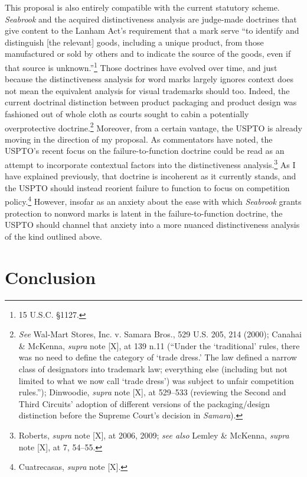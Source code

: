 \documentclass[letterpaper, 11pt, oneside]{article}
\begin{document}
This proposal is also entirely compatible with the current statutory scheme. \textit{Seabrook} and the acquired distinctiveness analysis are judge-made doctrines that give content to the Lanham Act's requirement that a mark serve ``to identify and distinguish [the relevant] goods, including a unique product, from those manufactured or sold by others and to indicate the source of the goods, even if that source is unknown.''\footnote{15 U.S.C. \S 1127.} Those doctrines have evolved over time, and just because the distinctiveness analysis for word marks largely ignores context does not mean the equivalent analysis for visual trademarks should too. Indeed, the current doctrinal distinction between product packaging and product design was fashioned out of whole cloth as courts sought to cabin a potentially overprotective doctrine.\footnote{\textit{See} Wal-Mart Stores, Inc. v. Samara Bros., 529 U.S. 205, 214 (2000); Canahai \& McKenna, \textit{supra} note [X], at 139 n.11 (``Under the `traditional' rules, there was no need to define the category of `trade dress.' The law defined a narrow class of designators into trademark law; everything else (including but not limited to what we now call `trade dress') was subject to unfair competition rules.''); Dinwoodie, \textit{supra} note [X], at 529–533 (reviewing the Second and Third Circuits' adoption of different versions of the packaging/design distinction before the Supreme Court's decision in \textit{Samara}).} Moreover, from a certain vantage, the USPTO is already moving in the direction of my proposal. As commentators have noted, the USPTO's recent focus on the failure-to-function doctrine could be read as an attempt to incorporate contextual factors into the distinctiveness analysis.\footnote{Roberts, \textit{supra} note [X], at 2006, 2009; \textit{see also} Lemley \& McKenna, \textit{supra} note [X], at 7, 54–55.} As I have explained previously, that doctrine is incoherent as it currently stands, and the USPTO should instead reorient failure to function to focus on competition policy.\footnote{Cuatrecasas, \textit{supra} note [X].} However, insofar as an anxiety about the ease with which \textit{Seabrook} grants protection to nonword marks is latent in the failure-to-function doctrine, the USPTO should channel that anxiety into a more nuanced distinctiveness analysis of the kind outlined above.

\section*{Conclusion}
\end{document}

